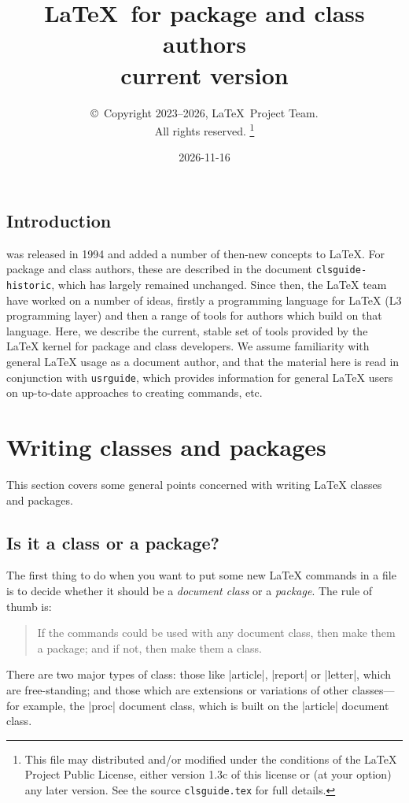 \documentclass{ltxguide}
\title{\LaTeX\ for package and class authors\\current version}
\author{\copyright~Copyright 2023--2026, \LaTeX\ Project Team.\\
   All rights reserved.%
   \footnote{This file may distributed and/or modified under the
     conditions of the \LaTeX{} Project Public License, either version 1.3c
     of this license or (at your option) any later version. See the source
    \texttt{clsguide.tex} for full details.}%
}
\date{2026-11-16}
\begin{document}
\maketitle

\tableofcontents

\subsection{Introduction}

\LaTeXe{} was released in 1994 and added a number of then-new concepts to
\LaTeX{}. For package and class authors, these are described in the document
\texttt{clsguide-historic}, which has largely remained unchanged. Since then,
the \LaTeX{} team have worked on a number of ideas, firstly a programming
language for \LaTeX{} (L3 programming layer) and then a range of tools for
authors which build on that language. Here, we describe the current, stable set
of tools provided by the \LaTeX{} kernel for package and class developers. We
assume familiarity with general \LaTeX{} usage as a document author, and that
the material here is read in conjunction with \texttt{usrguide}, which provides
information for general \LaTeX{} users on up-to-date approaches to creating
commands, etc.

\section{Writing classes and packages}
\label{sec:writing}

This section covers some general points concerned with writing
\LaTeX{} classes and packages.

\subsection{Is it a class or a package?}
\label{sec:classorpkg}

The first thing to do when you want to put some new \LaTeX{} commands
in a file is to decide whether it should be a \emph{document class} or a
\emph{package}.  The rule of thumb is:
\begin{quote}
  If the commands could be used with any document class, then make
  them a package; and if not, then make them a class.
\end{quote}

There are two major types of class: those like |article|, |report| or
|letter|, which are free-standing; and those which are extensions or
variations of other classes---for example, the |proc| document class,
which is built on the |article| document class.
\end{document}
